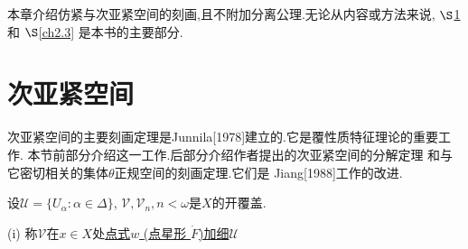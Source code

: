 \documentclass[main.tex]{subfiles}
\begin{document}
本章介绍仿紧与次亚紧空间的刻画,且不附加分离公理.无论从内容或方法来说, $\S$\ref{ch2.1} 和 $\S$\ref{ch2.3} 是本书的主要部分.

\section{次亚紧空间}\label{ch2.1}
次亚紧空间的主要刻画定理是Junnila[1978]建立的.它是覆性质特征理论的重要工作.
本节前部分介绍这一工作.后部分介绍作者提出的次亚紧空间的分解定理
和与它密切相关的集体$\theta$正规空间的刻画定理.它们是 Jiang[1988]工作的改进.

\begin{definition}
	设$\mathscr{U}=\{U_\alpha:\alpha\in\Delta\}$, $\mathscr{V}, \mathscr{V}_n, n<\omega$是$X$的开覆盖.
	
	\textnormal{(i)} 称$\mathscr{V}$在$x\in X$处\underline{点式$w$ \textnormal{(}点星形
	$\dot{F}$\textnormal{{)加细$\mathscr{U}$}}}
\end{definition}	
\end{document}
